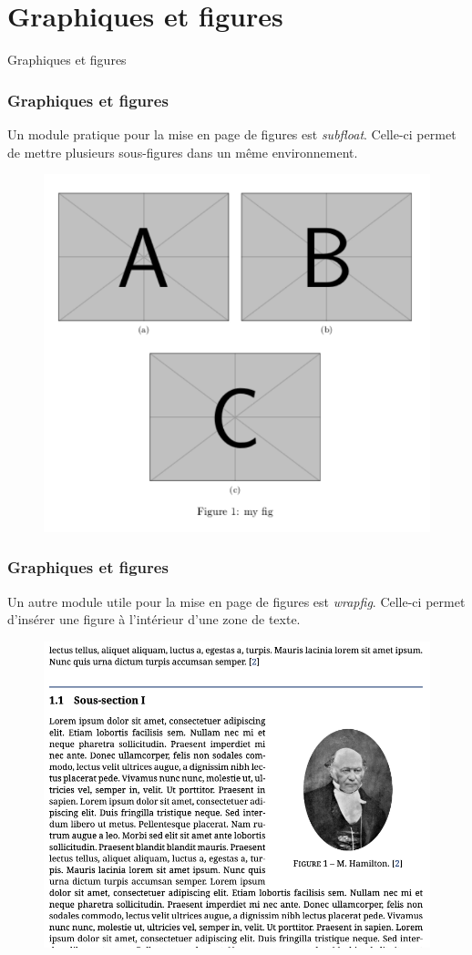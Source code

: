 
\section{Graphiques et figures}

\begin{frame}
    \vfill
    \begin{center}
        \large
        Graphiques et figures
    \end{center}
    \vfill
\end{frame}

\begin{frame}
    \frametitle{Graphiques et figures}
    Un module pratique pour la mise en page de figures est \textcolor{vibrant_green}{\textit{subfloat}}\footnotemark. Celle-ci permet de mettre plusieurs sous-figures dans un même environnement.
    \vfill
    \begin{figure}
        \centering
        \includegraphics[width=0.4\linewidth]{./figures/subfloat.png}
        \label{fig: subfloat}
    \end{figure}
\end{frame}

\begin{frame}
    \frametitle{Graphiques et figures}
    Un autre module utile pour la mise en page de figures est \textcolor{vibrant_green}{\textit{wrapfig}}\footnotemark. Celle-ci permet d'insérer une figure à l'intérieur d'une zone de texte.
    \vfill
    \begin{figure}
        \centering
        \includegraphics[width=0.45\linewidth]{./figures/wrapfig.png}
        \label{fig: wrapfig}
    \end{figure}
\end{frame}

